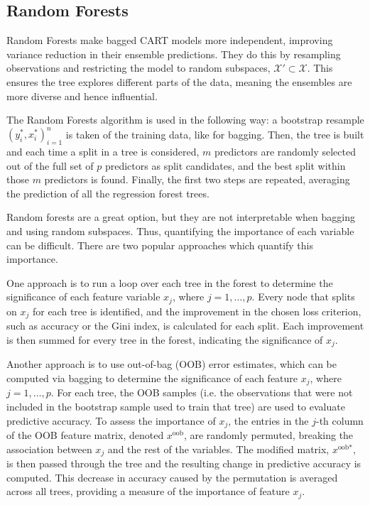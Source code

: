 \documentclass[11pt]{report} %
\begin{document}
\subsection{Random Forests}
\label{rf}
Random Forests make bagged CART models more independent, improving variance reduction in their ensemble predictions. They do this by resampling observations and restricting the model to random subspaces, $\mathcal{X}' \subset \mathcal{X}$. This ensures the tree explores different parts of the data, meaning the ensembles are more diverse and hence influential.\cite{breimanstatistics, ho1998random}

The Random Forests algorithm is used in the following way: a bootstrap resample \((y_i^*, x_i^*)_{i=1}^n\) is taken of the training data, like for bagging. Then, the tree is built and each time a split in a tree is considered, \(m\) predictors are randomly selected out of the full set of \(p\) predictors as split candidates, and the best split within those \(m\) predictors is found. Finally, the first two steps are repeated, averaging the prediction of all the regression forest trees.

Random forests are a great option, but they are not interpretable when bagging and using random subspaces. Thus, quantifying the importance of each variable can be difficult. There are two popular approaches which quantify this importance.

One approach is to run a loop over each tree in the forest to determine the significance of each feature variable \(x_j\), where \(j = 1,\dots,p\). Every node that splits on \(x_j\) for each tree is identified, and the improvement in the chosen loss criterion, such as accuracy or the Gini index, is calculated for each split. Each improvement is then summed for every tree in the forest, indicating the significance of \(x_j\).

Another approach is to use out-of-bag (OOB) error estimates, which can be computed via bagging to determine the significance of each feature \(x_j\), where \(j = 1, \dots, p\).\cite{breimanstatistics} For each tree, the OOB samples (i.e. the observations that were not included in the bootstrap sample used to train that tree) are used to evaluate predictive accuracy. To assess the importance of \(x_j\), the entries in the \(j\)-th column of the OOB feature matrix, denoted \(x^{\text{oob}}\), are randomly permuted, breaking the association between \(x_j\) and the rest of the variables. The modified matrix, \(x^{\text{oob}*}\), is then passed through the tree and the resulting change in predictive accuracy is computed. This decrease in accuracy caused by the permutation is averaged across all trees, providing a measure of the importance of feature \(x_j\).
\end{document}
